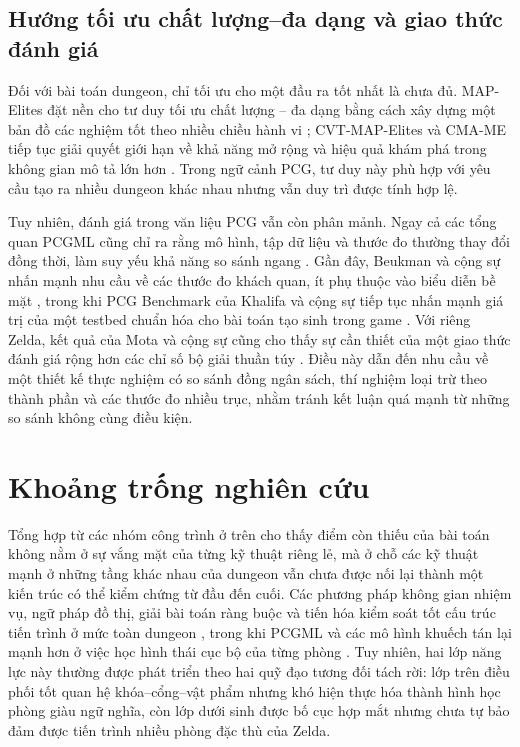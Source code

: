 \documentclass[oneside,a4paper,12pt]{extreport}
\begin{document}
\subsection{Hướng tối ưu chất lượng--đa dạng và giao thức đánh giá}
Đối với bài toán dungeon, chỉ tối ưu cho một đầu ra tốt nhất là chưa đủ. MAP-Elites đặt nền cho tư duy tối ưu chất lượng -- đa dạng bằng cách xây dựng một bản đồ các nghiệm tốt theo nhiều chiều hành vi \cite{mouret2015mapelites}; CVT-MAP-Elites và CMA-ME tiếp tục giải quyết giới hạn về khả năng mở rộng và hiệu quả khám phá trong không gian mô tả lớn hơn \cite{vassiliades2017cvt,fontaine2020cma}. Trong ngữ cảnh PCG, tư duy này phù hợp với yêu cầu tạo ra nhiều dungeon khác nhau nhưng vẫn duy trì được tính hợp lệ.

Tuy nhiên, đánh giá trong văn liệu PCG vẫn còn phân mảnh. Ngay cả các tổng quan PCGML cũng chỉ ra rằng mô hình, tập dữ liệu và thước đo thường thay đổi đồng thời, làm suy yếu khả năng so sánh ngang \cite{summerville2018pcgml}. Gần đây, Beukman và cộng sự nhấn mạnh nhu cầu về các thước đo khách quan, ít phụ thuộc vào biểu diễn bề mặt \cite{beukman2022objective}, trong khi PCG Benchmark của Khalifa và cộng sự tiếp tục nhấn mạnh giá trị của một testbed chuẩn hóa cho bài toán tạo sinh trong game \cite{khalifa2025pcgbenchmark}. Với riêng Zelda, kết quả của Mota và cộng sự cũng cho thấy sự cần thiết của một giao thức đánh giá rộng hơn các chỉ số bộ giải thuần túy \cite{mota2021dungeon}. Điều này dẫn đến nhu cầu về một thiết kế thực nghiệm có so sánh đồng ngân sách, thí nghiệm loại trừ theo thành phần và các thước đo nhiều trục, nhằm tránh kết luận quá mạnh từ những so sánh không cùng điều kiện.

\section{Khoảng trống nghiên cứu}
Tổng hợp từ các nhóm công trình ở trên cho thấy điểm còn thiếu của bài toán không nằm ở sự vắng mặt của từng kỹ thuật riêng lẻ, mà ở chỗ các kỹ thuật mạnh ở những tầng khác nhau của dungeon vẫn chưa được nối lại thành một kiến trúc có thể kiểm chứng từ đầu đến cuối. Các phương pháp không gian nhiệm vụ, ngữ pháp đồ thị, giải bài toán ràng buộc và tiến hóa kiểm soát tốt cấu trúc tiến trình ở mức toàn dungeon \cite{dormans2011missionspaces,mota2021dungeon}, trong khi PCGML và các mô hình khuếch tán lại mạnh hơn ở việc học hình thái cục bộ của từng phòng \cite{summerville2018pcgml,dai2024singleexample}. Tuy nhiên, hai lớp năng lực này thường được phát triển theo hai quỹ đạo tương đối tách rời: lớp trên điều phối tốt quan hệ khóa--cổng--vật phẩm nhưng khó hiện thực hóa thành hình học phòng giàu ngữ nghĩa, còn lớp dưới sinh được bố cục hợp mắt nhưng chưa tự bảo đảm được tiến trình nhiều phòng đặc thù của Zelda.
\end{document}
